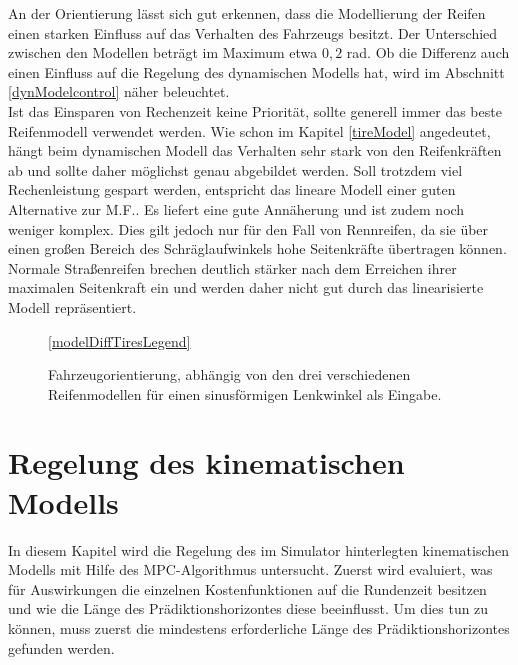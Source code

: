 \documentclass{like}
\begin{document}
An der Orientierung lässt sich gut erkennen, dass die Modellierung der Reifen einen starken Einfluss auf das Verhalten des Fahrzeugs besitzt. Der Unterschied zwischen den Modellen beträgt im Maximum etwa $0,2$ rad. 
Ob die Differenz auch einen Einfluss auf die Regelung des dynamischen Modells hat, wird im Abschnitt \ref{dynModelcontrol} näher beleuchtet. \\
Ist das Einsparen von Rechenzeit keine Priorität, sollte generell immer das beste Reifen\-mo\-dell verwendet werden. Wie schon im Kapitel \ref{tireModel} angedeutet, hängt beim dynamischen Modell das Verhalten sehr stark von den Reifenkräften ab und sollte daher möglichst genau abgebildet werden. Soll trotzdem viel Rechenleistung gespart werden, entspricht das lineare Modell einer guten Alternative zur \ac{M.F.}. Es liefert eine gute Annäherung und ist zudem noch weniger komplex. Dies gilt jedoch nur für den Fall von Rennreifen, da sie über einen großen Bereich des Schräglaufwinkels hohe Seitenkräfte übertragen können. Normale Straßenreifen brechen deutlich stärker nach dem Erreichen ihrer maximalen Seitenkraft ein und werden daher nicht gut durch das linearisierte Modell repräsentiert. 


\begin{figure}
	\centering
	 
	\ref{modelDiffTiresLegend}
	\caption{Fahrzeugorientierung, abhängig von den drei verschiedenen Reifenmodellen für einen sinusförmigen Lenkwinkel als Eingabe.}
	\label{fig:modelDiffTires}
\end{figure}

\newpage
\section{Regelung des kinematischen Modells}
In diesem Kapitel wird die Regelung des im Simulator hinterlegten kinematischen Modells mit Hilfe des \ac{MPC}-Algorithmus untersucht. Zuerst wird evaluiert, was für Auswirkungen die einzelnen Kostenfunktionen auf die Rundenzeit besitzen und wie die Länge des Prädiktionshorizontes diese beeinflusst.
Um dies tun zu können, muss zuerst die mindestens erforderliche Länge des Prädiktionshorizontes gefunden werden. 
\end{document}
